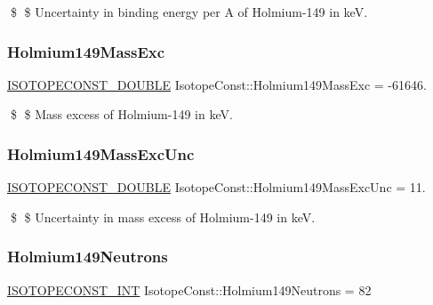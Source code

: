 \$ \$ Uncertainty in binding energy per A of Holmium-\/149 in keV. \mbox{\label{group___isotope_const-_holmium-_ho149_gad73f80d57ad89d60f80c3b7add5b95fb}} 
\subsubsection{\texorpdfstring{Holmium149\+Mass\+Exc}{Holmium149MassExc}}
{\footnotesize\ttfamily \mbox{\hyperlink{group___isotope_const-_macros_ga8f45a7272ce02c0b4c65c44636ed719a}{I\+S\+O\+T\+O\+P\+E\+C\+O\+N\+S\+T\+\_\+\+D\+O\+U\+B\+LE}} Isotope\+Const\+::\+Holmium149\+Mass\+Exc = -\/61646.}

\$ \$ Mass excess of Holmium-\/149 in keV. \mbox{\label{group___isotope_const-_holmium-_ho149_ga94509c4600f00208f82d69c6e60a6f8c}} 
\subsubsection{\texorpdfstring{Holmium149\+Mass\+Exc\+Unc}{Holmium149MassExcUnc}}
{\footnotesize\ttfamily \mbox{\hyperlink{group___isotope_const-_macros_ga8f45a7272ce02c0b4c65c44636ed719a}{I\+S\+O\+T\+O\+P\+E\+C\+O\+N\+S\+T\+\_\+\+D\+O\+U\+B\+LE}} Isotope\+Const\+::\+Holmium149\+Mass\+Exc\+Unc = 11.}

\$ \$ Uncertainty in mass excess of Holmium-\/149 in keV. \mbox{\label{group___isotope_const-_holmium-_ho149_ga954eca04e851fe5ba51db52e8a9c6122}} 
\subsubsection{\texorpdfstring{Holmium149\+Neutrons}{Holmium149Neutrons}}
{\footnotesize\ttfamily \mbox{\hyperlink{group___isotope_const-_macros_ga5f18360b3e99483a35c32d789e62621c}{I\+S\+O\+T\+O\+P\+E\+C\+O\+N\+S\+T\+\_\+\+I\+NT}} Isotope\+Const\+::\+Holmium149\+Neutrons = 82}


